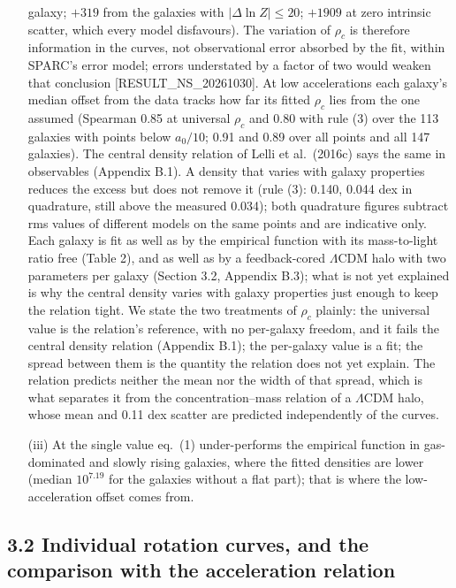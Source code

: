 \documentclass[
  10pt,
]{article}
\begin{document}
\begin{itemize}
galaxy; $+319$ from the galaxies with $|\Delta\ln Z|\le20$; $+1909$ at zero intrinsic scatter, which every model disfavours). The variation of $\rho_c$ is therefore information in the curves, not observational error absorbed by the fit, within SPARC's error model; errors understated by a factor of two would weaken that conclusion {[}RESULT\_NS\_20261030{]}. At low accelerations each galaxy's median offset from the data tracks how far its fitted $\rho_c$ lies from the one assumed (Spearman 0.85 at universal $\rho_c$ and 0.80 with rule (3) over the 113 galaxies with points below $a_0/10$; 0.91 and 0.89 over all points and all 147 galaxies). The central density relation of Lelli et al.~(2016c) says the same in observables (Appendix B.1). A density that varies with galaxy properties reduces the excess but does not remove it (rule (3): 0.140, 0.044 dex in quadrature, still above the measured 0.034); both quadrature figures subtract rms values of different models on the same points and are indicative only. Each galaxy is fit as well as by the empirical function with its mass-to-light ratio free (Table 2), and as well as by a feedback-cored $\Lambda$CDM halo with two parameters per galaxy (Section 3.2, Appendix B.3); what is not yet explained is why the central density varies with galaxy properties just enough to keep the relation tight. We state the two treatments of $\rho_c$ plainly: the universal value is the relation's reference, with no per-galaxy freedom, and it fails the central density relation (Appendix B.1); the per-galaxy value is a fit; the spread between them is the quantity the relation does not yet explain. The relation predicts neither the mean nor the width of that spread, which is what separates it from the concentration--mass relation of a $\Lambda$CDM halo, whose mean and 0.11 dex scatter are predicted independently of the curves.
\item[(iii)] At the single value eq.~(1) under-performs the empirical function in gas-dominated and slowly rising galaxies, where the fitted densities are lower (median $10^{7.19}$ for the galaxies without a flat part); that is where the low-acceleration offset comes from.
\end{itemize}


\subsection{3.2 Individual rotation curves, and the comparison with the acceleration relation}\label{individual-rotation-curves-and-the-comparison-with-the-acceleration-relation}
\end{document}
